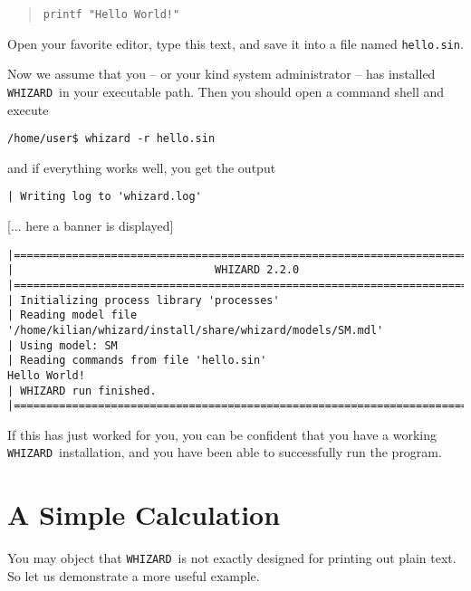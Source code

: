 \documentclass[12pt]{book}
\newcommand{\whizard}{\texttt{WHIZARD}}
\begin{document}
\begin{quote}
\begin{verbatim}
printf "Hello World!"
\end{verbatim}
\end{quote}
Open your favorite editor, type this text, and save it into a file
named \verb|hello.sin|.

Now we assume that you -- or your kind system administrator -- has
installed \whizard\ in your executable path.  Then you should open a
command shell and execute
\begin{verbatim}
/home/user$ whizard -r hello.sin
\end{verbatim}
and if everything works well, you get the output
\begin{footnotesize}
\begin{verbatim}
| Writing log to 'whizard.log'
\end{verbatim}
\centerline{[... here a banner is displayed]}
\begin{verbatim}
|=============================================================================|
|                               WHIZARD 2.2.0
|=============================================================================|
| Initializing process library 'processes'
| Reading model file '/home/kilian/whizard/install/share/whizard/models/SM.mdl'
| Using model: SM
| Reading commands from file 'hello.sin'
Hello World!
| WHIZARD run finished.
|=============================================================================|
\end{verbatim}
\end{footnotesize}
If this has just worked for you, you can be confident that you have a working
\whizard\ installation, and you have been able to successfully run the
program.


\section{A Simple Calculation}
You may object that \whizard\ is not exactly designed for printing out
plain text.  So let us demonstrate a more useful example.
\end{document}
